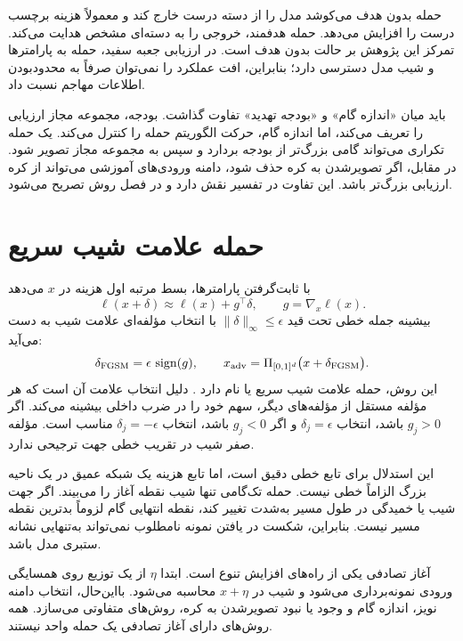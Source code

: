 حمله بدون هدف می‌کوشد مدل را از دسته درست خارج کند و معمولاً هزینه برچسب درست را افزایش می‌دهد. حمله هدفمند، خروجی را به دسته‌ای مشخص هدایت می‌کند. تمرکز این پژوهش بر حالت بدون هدف است. در ارزیابی جعبه سفید، حمله به پارامترها و شیب مدل دسترسی دارد؛ بنابراین، افت عملکرد را نمی‌توان صرفاً به محدودبودن اطلاعات مهاجم نسبت داد.

باید میان «اندازه گام» و «بودجه تهدید» تفاوت گذاشت. بودجه، مجموعه مجاز ارزیابی را تعریف می‌کند، اما اندازه گام، حرکت الگوریتم حمله را کنترل می‌کند. یک حمله تکراری می‌تواند گامی بزرگ‌تر از بودجه بردارد و سپس به مجموعه مجاز تصویر شود. در مقابل، اگر تصویرشدن به کره حذف شود، دامنه ورودی‌های آموزشی می‌تواند از کره ارزیابی بزرگ‌تر باشد. این تفاوت در تفسیر \sora{} نقش دارد و در فصل روش تصریح می‌شود.

\section{حمله علامت شیب سریع}
با ثابت‌گرفتن پارامترها، بسط مرتبه اول هزینه در $x$ می‌دهد
\begin{equation}\label{eq:firstorder}
\ell(x+\delta)\approx\ell(x)+g^\top\delta,\qquad g=\nabla_x\ell(x).
\end{equation}
بیشینه جمله خطی تحت قید $\|\delta\|_\infty\leq\epsilon$ با انتخاب مؤلفه‌ای علامت شیب به دست می‌آید:
\begin{equation}\label{eq:fgsm}
\delta_{\mathrm{FGSM}}=\epsilon\,\operatorname{sign}(g),\qquad
x_{\mathrm{adv}}=\Pi_{[0,1]^d}\bigl(x+\delta_{\mathrm{FGSM}}\bigr).
\end{equation}
این روش، حمله علامت شیب سریع یا  نام دارد \cite{goodfellow2015explaining}. دلیل انتخاب علامت آن است که هر مؤلفه مستقل از مؤلفه‌های دیگر، سهم خود را در ضرب داخلی بیشینه می‌کند. اگر $g_j>0$ باشد، انتخاب $\delta_j=\epsilon$ و اگر $g_j<0$ باشد، انتخاب $\delta_j=-\epsilon$ مناسب است. مؤلفه صفر شیب در تقریب خطی جهت ترجیحی ندارد.

این استدلال برای تابع خطی دقیق است، اما تابع هزینه یک شبکه عمیق در یک ناحیه بزرگ الزاماً خطی نیست. حمله تک‌گامی تنها شیب نقطه آغاز را می‌بیند. اگر جهت شیب یا خمیدگی در طول مسیر به‌شدت تغییر کند، نقطه انتهایی گام لزوماً بدترین نقطه مسیر نیست. بنابراین، شکست  در یافتن نمونه نامطلوب نمی‌تواند به‌تنهایی نشانه ستبری مدل باشد.

آغاز تصادفی یکی از راه‌های افزایش تنوع است. ابتدا $\eta$ از یک توزیع روی همسایگی ورودی نمونه‌برداری می‌شود و شیب در $x+\eta$ محاسبه می‌شود. بااین‌حال، انتخاب دامنه نویز، اندازه گام و وجود یا نبود تصویرشدن به کره، روش‌های متفاوتی می‌سازد. همه روش‌های دارای آغاز تصادفی یک حمله واحد نیستند.


